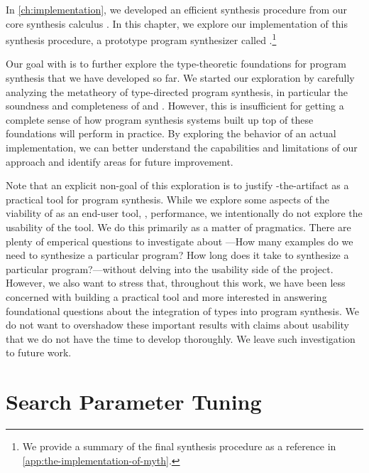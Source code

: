 In \autoref{ch:implementation}, we developed an efficient synthesis procedure from our core synthesis calculus \mlsyn{}.
In this chapter, we explore our implementation of this synthesis procedure, a prototype program synthesizer called \myth{}.\footnote{%
  We provide a summary of the final synthesis procedure as a reference in \autoref{app:the-implementation-of-myth}.
}

Our goal with \myth{} is to further explore the type-theoretic foundations for program synthesis that we have developed so far.
We started our exploration by carefully analyzing the metatheory of type-directed program synthesis, in particular the soundness and completeness of \lsyn{} and \mlsyn{}.
However, this is insufficient for getting a complete sense of how program synthesis systems built up top of these foundations will perform in practice.
By exploring the behavior of an actual implementation, we can better understand the capabilities and limitations of our approach and identify areas for future improvement.

Note that an explicit non-goal of this exploration is to justify \myth{}-the-artifact as a practical tool for program synthesis.
While we explore some aspects of the viability of \myth{} as an end-user tool, \eg, performance, we intentionally do not explore the usability of the tool.
We do this primarily as a matter of pragmatics.
There are plenty of emperical questions to investigate about \myth{}---How many examples do we need to synthesize a particular program?  How long does it take to synthesize a particular program?---without delving into the usability side of the project.
However, we also want to stress that, throughout this work, we have been less concerned with building a practical tool and more interested in answering foundational questions about the integration of types into program synthesis.
We do not want to overshadow these important results with claims about usability that we do not have the time to develop thoroughly.
We leave such investigation to future work.

\section{Search Parameter Tuning}
\label{sec:search-parameter-tuning}

